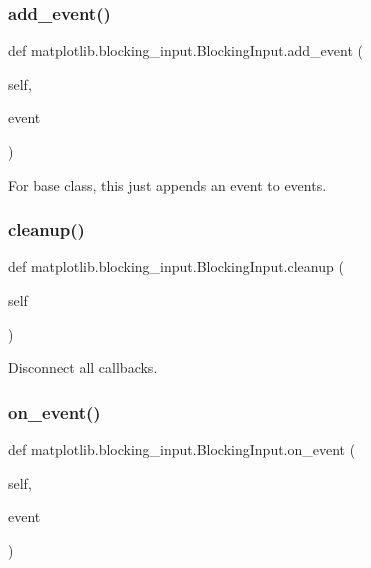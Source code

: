 \subsubsection{\texorpdfstring{add\+\_\+event()}{add\_event()}}
{\footnotesize\ttfamily def matplotlib.\+blocking\+\_\+input.\+Blocking\+Input.\+add\+\_\+event (\begin{DoxyParamCaption}\item[{}]{self,  }\item[{}]{event }\end{DoxyParamCaption})}

\begin{DoxyVerb}For base class, this just appends an event to events.\end{DoxyVerb}
 \mbox{\label{classmatplotlib_1_1blocking__input_1_1BlockingInput_a395fd2f0f16ac473fe46e56045df9c8b}} 
\subsubsection{\texorpdfstring{cleanup()}{cleanup()}}
{\footnotesize\ttfamily def matplotlib.\+blocking\+\_\+input.\+Blocking\+Input.\+cleanup (\begin{DoxyParamCaption}\item[{}]{self }\end{DoxyParamCaption})}

\begin{DoxyVerb}Disconnect all callbacks.\end{DoxyVerb}
 \mbox{\label{classmatplotlib_1_1blocking__input_1_1BlockingInput_a753fe68b7702fa864696db1854485e40}} 
\subsubsection{\texorpdfstring{on\+\_\+event()}{on\_event()}}
{\footnotesize\ttfamily def matplotlib.\+blocking\+\_\+input.\+Blocking\+Input.\+on\+\_\+event (\begin{DoxyParamCaption}\item[{}]{self,  }\item[{}]{event }\end{DoxyParamCaption})}

